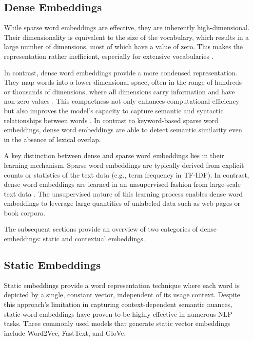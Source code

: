 \subsection{Dense Embeddings} \label{sec:dense-embeddings}

While sparse word embeddings are effective, they are inherently high-dimensional. Their dimensionality is equivalent to the size of the vocabulary, which results in a large number of dimensions, most of which have a value of zero.
This makes the representation rather inefficient, especially for extensive vocabularies \cite{ManningIntroductionInformation2008,JurafskySpeechLanguage2022}.

In contrast, dense word embeddings provide a more condensed representation. They map words into a lower-dimensional space, often in the range of hundreds or thousands of dimensions, where all dimensions carry information and have non-zero values \cite{MikolovEfficientEstimation2013, PenningtonGloveGlobal2014, BojanowskiEnrichingWord2017}. This compactness not only enhances computational efficiency but also improves the model's capacity to capture semantic and syntactic relationships between words \cite{MikolovEfficientEstimation2013, PenningtonGloveGlobal2014}.
In contrast to keyword-based sparse word embeddings, dense word embeddings are able to detect semantic similarity even in the absence of lexical overlap.

A key distinction between dense and sparse word embeddings lies in their learning mechanism. Sparse word embeddings are typically derived from explicit counts or statistics of the text data (e.g., term frequency in TF-IDF). In contrast, dense word embeddings are learned in an unsupervised fashion from large-scale text data \cite{ManningIntroductionInformation2008,JurafskySpeechLanguage2022}. The unsupervised nature of this learning process enables dense word embeddings to leverage large quantities of unlabeled data such as web pages or book corpora.

The subsequent sections provide an overview of two categories of dense embeddings: static and contextual embeddings.


\subsection{Static Embeddings} \label{sec:static-embeddings}

Static embeddings provide a word representation technique where each word is depicted by a single, constant vector, independent of its usage context. Despite this approach's limitation in capturing context-dependent semantic nuances, static word embeddings have proven to be highly effective in numerous \ac{NLP} tasks. Three commonly used models that generate static vector embeddings include Word2Vec, FastText, and GloVe.

